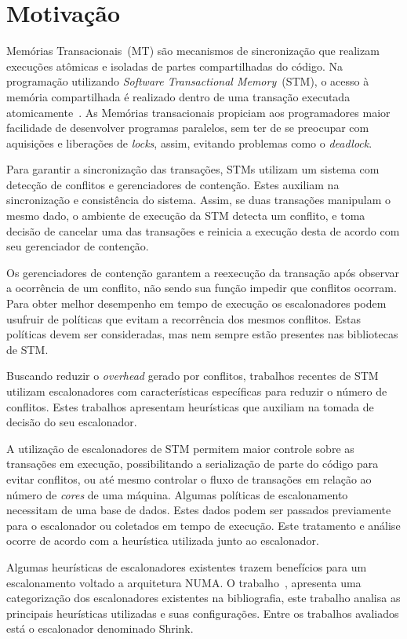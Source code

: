 \documentclass[diss-proposta,nocipinfo]{texufpel}
\begin{document}
\chapter{Motivação}

Memórias Transacionais~(MT) são mecanismos de sincronização que realizam execuções atômicas e isoladas de partes compartilhadas do código. Na programação utilizando \emph{Software Transactional Memory}~(STM), o acesso à memória compartilhada é realizado dentro de uma transação executada atomicamente~\cite{teixeira15}. As Memórias transacionais propiciam aos programadores maior facilidade de desenvolver programas paralelos, sem ter de se preocupar com aquisições e liberações de \emph{locks}, assim, evitando problemas como o \emph{deadlock}.

Para garantir a sincronização das transações, STMs utilizam um sistema com detecção de conflitos e gerenciadores de contenção. Estes auxiliam na sincronização e consistência do sistema. Assim, se duas transações manipulam o mesmo dado, o ambiente de execução da STM detecta um conflito, e toma decisão de cancelar uma das transações e reinicia a execução desta de acordo com seu gerenciador de contenção.

Os gerenciadores de contenção garantem a reexecução da transação após observar a ocorrência de um conflito, não sendo sua função impedir que conflitos ocorram. Para obter melhor desempenho em tempo de execução os escalonadores podem usufruir de políticas que evitam a recorrência dos mesmos conflitos. Estas políticas devem ser consideradas, mas nem sempre estão presentes nas bibliotecas de STM.

Buscando reduzir o \emph{overhead} gerado por conflitos, trabalhos recentes de STM utilizam escalonadores com características específicas para reduzir o número de conflitos. Estes trabalhos apresentam heurísticas que auxiliam na tomada de decisão do seu escalonador.

A utilização de escalonadores de STM permitem maior controle sobre as transações em execução, possibilitando a serialização de parte do código para evitar conflitos, ou até mesmo controlar o fluxo de transações em relação ao número de \emph{cores} de uma máquina. Algumas políticas de escalonamento necessitam de uma base de dados. Estes dados podem ser passados previamente para o escalonador ou coletados em tempo de execução. Este tratamento e análise ocorre de acordo com a heurística utilizada junto ao escalonador.

Algumas heurísticas de escalonadores existentes trazem benefícios para um escalonamento voltado a arquitetura NUMA. O trabalho~\cite{sanzo17}, apresenta uma categorização dos escalonadores existentes na bibliografia, este trabalho analisa as principais heurísticas utilizadas e suas configurações. Entre os trabalhos avaliados está o escalonador denominado Shrink.
\end{document}
